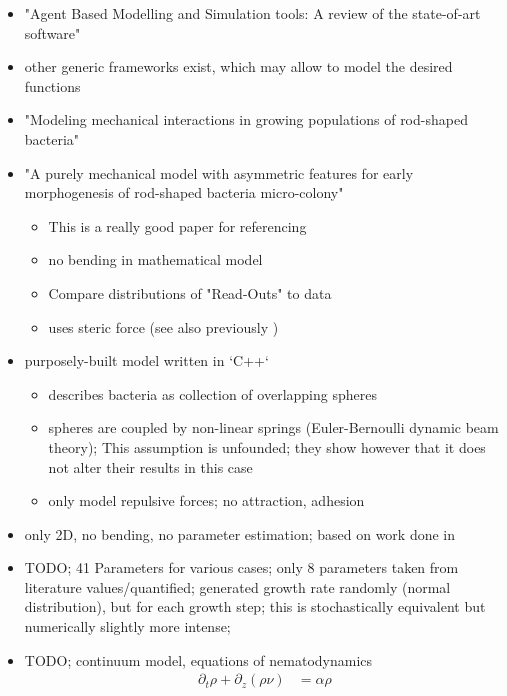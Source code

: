 \documentclass{article}
\begin{document}
\begin{itemize}
    \item \cite{Abar2017} "Agent Based Modelling and Simulation tools: A review of the state-of-art software"
    \item other generic frameworks exist, which may allow to model the desired functions
    \item \cite{Winkle2017} "Modeling mechanical interactions in growing populations of rod-shaped bacteria"
    \item \cite{Doumic2020} "A purely mechanical model with asymmetric features for early morphogenesis of
  rod-shaped bacteria micro-colony"
    \begin{itemize}
        \item This is a really good paper for referencing
        \item no bending in mathematical model
        \item Compare distributions of "Read-Outs" to data
        \item uses steric force (see also previously \cite{Trejo2013})
    \end{itemize}
    \item \cite{Grant2014} purposely-built model written in `C++`
    \begin{itemize}
        \item describes bacteria as collection of overlapping spheres
        \item spheres are coupled by non-linear springs (Euler-Bernoulli dynamic beam theory);
        This assumption is unfounded; they show however that it does not alter their results in this
        case
        \item only model repulsive forces; no attraction, adhesion
    \end{itemize}
    \item \cite{Cho2007} only 2D, no bending, no parameter estimation; based on work done in 
        \cite{Jnsson2005}
    \item \cite{Storck2014} TODO;
    41 Parameters for various cases;
    only 8 parameters taken from literature values/quantified;
    generated growth rate randomly (normal distribution), but for each growth step; this is
      stochastically equivalent but numerically slightly more intense;
    \item \cite{Volfson2008} TODO; continuum model, equations of nematodynamics \cite{Doi1988-ad}
    \begin{align}
        \partial_t \rho + \partial_z (\rho \nu) &= \alpha \rho\\

\end{align}
\end{itemize}
\end{document}
